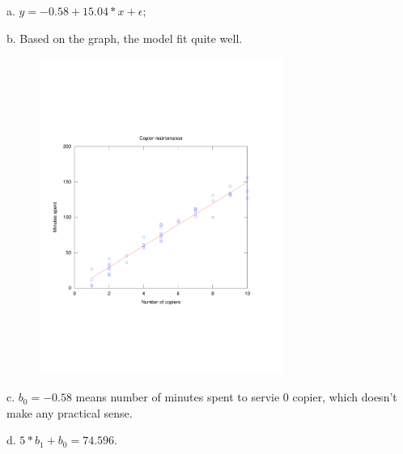 \documentclass[12pt]{article}
\begin{document}
 { \vfill
  \answer
} {
  a. $y = -0.58 + 15.04*x + \epsilon$; 

  b. Based on the graph, the model fit quite well.
\begin{figure}[htbp]
  \centering
  \includegraphics[width=8cm]{graph.pdf}
  \end{figure}
  
  c. $b_0=-0.58$ means number of minutes spent to servie 0 copier, which doesn't make any practical sense.

  d. $5*b_1+b_0=74.596$.
} 



\problemsdone
\end{document}
